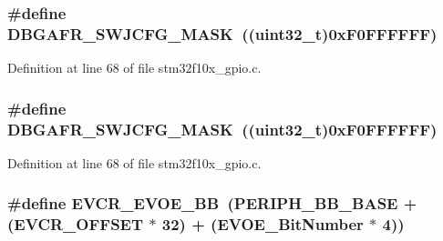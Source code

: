 \subsubsection[{\texorpdfstring{D\+B\+G\+A\+F\+R\+\_\+\+S\+W\+J\+C\+F\+G\+\_\+\+M\+A\+SK}{DBGAFR_SWJCFG_MASK}}]{\setlength{\rightskip}{0pt plus 5cm}\#define D\+B\+G\+A\+F\+R\+\_\+\+S\+W\+J\+C\+F\+G\+\_\+\+M\+A\+SK~(({\bf uint32\+\_\+t})0x\+F0\+F\+F\+F\+F\+F\+F)}\hypertarget{group___g_p_i_o___private___defines_ga47a1cd3c0505a7be3e161671237d8460}{}\label{group___g_p_i_o___private___defines_ga47a1cd3c0505a7be3e161671237d8460}


Definition at line 68 of file stm32f10x\+\_\+gpio.\+c.

\subsubsection[{\texorpdfstring{D\+B\+G\+A\+F\+R\+\_\+\+S\+W\+J\+C\+F\+G\+\_\+\+M\+A\+SK}{DBGAFR_SWJCFG_MASK}}]{\setlength{\rightskip}{0pt plus 5cm}\#define D\+B\+G\+A\+F\+R\+\_\+\+S\+W\+J\+C\+F\+G\+\_\+\+M\+A\+SK~(({\bf uint32\+\_\+t})0x\+F0\+F\+F\+F\+F\+F\+F)}\hypertarget{group___g_p_i_o___private___defines_ga47a1cd3c0505a7be3e161671237d8460}{}\label{group___g_p_i_o___private___defines_ga47a1cd3c0505a7be3e161671237d8460}


Definition at line 68 of file stm32f10x\+\_\+gpio.\+c.

\subsubsection[{\texorpdfstring{E\+V\+C\+R\+\_\+\+E\+V\+O\+E\+\_\+\+BB}{EVCR_EVOE_BB}}]{\setlength{\rightskip}{0pt plus 5cm}\#define E\+V\+C\+R\+\_\+\+E\+V\+O\+E\+\_\+\+BB~({\bf P\+E\+R\+I\+P\+H\+\_\+\+B\+B\+\_\+\+B\+A\+SE} + ({\bf E\+V\+C\+R\+\_\+\+O\+F\+F\+S\+ET} $\ast$ 32) + ({\bf E\+V\+O\+E\+\_\+\+Bit\+Number} $\ast$ 4))}\hypertarget{group___g_p_i_o___private___defines_ga6e4f8c4e3def38811ac6c03b4f64240b}{}\label{group___g_p_i_o___private___defines_ga6e4f8c4e3def38811ac6c03b4f64240b}


